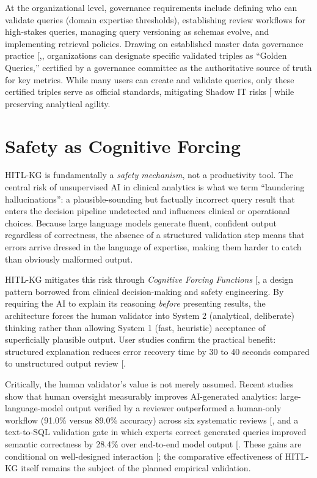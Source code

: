 \documentclass[
  american,
  11pt,
  letterpaper,
  oneside  ,captions=tableheading
]{scrartcl}
\begin{document}
At the organizational level, governance requirements include defining
who can validate queries (domain expertise thresholds), establishing
review workflows for high-stakes queries, managing query versioning as
schemas evolve, and implementing retrieval policies. Drawing on
established master data governance practice
{[},\citeproc{ref-kalyanasundaram2025}{77}{]},
organizations can designate specific validated triples as ``Golden
Queries,'' certified by a governance committee as the authoritative
source of truth for key metrics. While many users can create and
validate queries, only these certified triples serve as official
standards, mitigating Shadow IT risks
{[}\citeproc{ref-zimmermann2017}{78}{]} while preserving analytical
agility.

\section{Safety as Cognitive Forcing}\label{safety-as-cognitive-forcing}

HITL-KG is fundamentally a \emph{safety mechanism}, not a productivity
tool. The central risk of unsupervised AI in clinical analytics is what
we term ``laundering hallucinations'': a plausible-sounding but
factually incorrect query result that enters the decision pipeline
undetected and influences clinical or operational choices. Because large
language models generate fluent, confident output regardless of
correctness, the absence of a structured validation step means that
errors arrive dressed in the language of expertise, making them harder
to catch than obviously malformed output.

HITL-KG mitigates this risk through \emph{Cognitive Forcing Functions}
{[}\citeproc{ref-ziletti2024}{37}{]}, a design pattern borrowed from
clinical decision-making and safety engineering. By requiring the AI to
explain its reasoning \emph{before} presenting results, the architecture
forces the human validator into System 2 (analytical, deliberate)
thinking rather than allowing System 1 (fast, heuristic) acceptance of
superficially plausible output. User studies confirm the practical
benefit: structured explanation reduces error recovery time by 30 to 40
seconds compared to unstructured output review
{[}\citeproc{ref-ipeirotis2025}{79}{]}.

Critically, the human validator's value is not merely assumed. Recent
studies show that human oversight measurably improves AI-generated
analytics: large-language-model output verified by a reviewer
outperformed a human-only workflow (91.0\% versus 89.0\% accuracy)
across six systematic reviews {[}\citeproc{ref-gartlehner2025}{80}{]},
and a text-to-SQL validation gate in which experts correct generated
queries improved semantic correctness by 28.4\% over end-to-end model
output {[}\citeproc{ref-benzarti2026}{81}{]}. These gains are
conditional on well-designed interaction
{[}\citeproc{ref-ning2024}{82}{]}; the comparative effectiveness of
HITL-KG itself remains the subject of the planned empirical validation.
\end{document}
